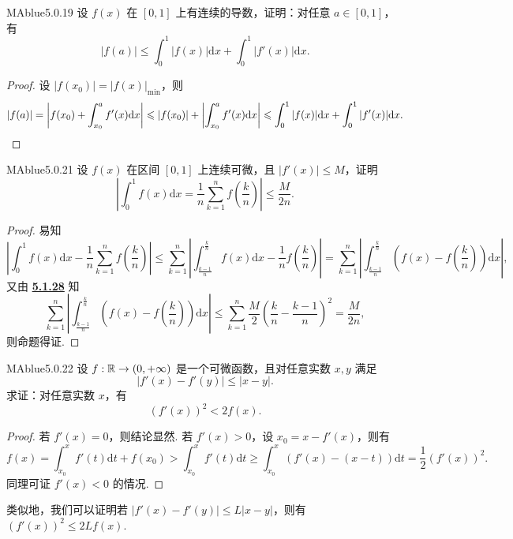 \begin{problem}{MAblue}{5.0.19}
    设 $f(x)$ 在 $[0, 1]$ 上有连续的导数，证明：对任意 $a \in [0, 1]$，有
    \[
        |f(a)| \leqslant \int_0^1 |f(x)| \mathrm dx + \int_0^1 |f'(x)| \mathrm dx.
    \]
\end{problem}

\begin{proof}
    设 $|f(x_0)| = |f(x)|_{\min}$，则
    \[
        |f(a)| = \left| f(x_0) + \int_{x_0}^a f'(x) \mathrm dx \right| \leqslant |f(x_0)| + \left| \int_{x_0}^a f'(x) \mathrm dx \right| \leqslant \int_0^1 |f(x)| \mathrm dx + \int_0^1 |f'(x)| \mathrm dx. \qedhere
    \]
\end{proof}

\begin{problem}{MAblue}{5.0.21}
    设 $f(x)$ 在区间 $[0, 1]$ 上连续可微，且 $|f'(x)| \leqslant M$，证明
    \[
        \left| \int_0^1 f(x) \mathrm dx = \frac 1 n \sum_{k=1}^n f \left( \frac k n \right) \right| \leqslant \frac M {2n}.
    \]
\end{problem}

\begin{proof}
    易知
    {\small
        \[
            \left| \int_0^1 f(x) \mathrm dx - \frac 1 n \sum_{k=1}^n f\left( \frac k n \right) \right| \leqslant \sum_{k=1}^n \left| \int_{\frac {k-1} n}^{\frac k n} f(x) \mathrm dx - \frac 1 n f\left( \frac k n \right) \right| = \sum_{k=1}^n \left| \int_{\frac {k-1} n}^{\frac k n} \left( f(x) - f\left( \frac k n \right) \right) \mathrm dx \right|,
        \]
    }
    {\flushleft 又由 \hyperref[item:28]{\textbf{5.1.28}} 知}
    \[
        \sum_{k=1}^n \left| \int_{\frac {k-1} n}^{\frac k n} \left( f(x) - f\left( \frac k n \right) \right) \mathrm dx \right| \leqslant \sum_{k=1}^n \frac M 2 (\frac k n - \frac {k-1} n)^2 = \frac M {2n},
    \]
    则命题得证.
\end{proof}

\begin{problem}{MAblue}{5.0.22}
    设 $f : \mathbb R \to (0, +\infty)$ 是一个可微函数，且对任意实数 $x, y$ 满足
    \[
        |f'(x)-f'(y)| \leqslant |x-y|.
    \]
    求证：对任意实数 $x$，有
    \[
        \left( f'(x) \right)^2 < 2f(x).
    \]
\end{problem}

\begin{proof}
    若 $f'(x) = 0$，则结论显然. 若 $f'(x) > 0$，设 $x_0 = x - f'(x)$，则有
    \[
        f(x) = \int_{x_0}^x f'(t) \mathrm dt + f(x_0) > \int_{x_0}^x f'(t) \mathrm dt \geqslant \int_{x_0}^x (f'(x) - (x-t)) \mathrm dt = \frac 1 2 (f'(x))^2.
    \]
    同理可证 $f'(x) < 0$ 的情况.
\end{proof}
{\flushleft 类似地，我们可以证明若 $|f'(x) - f'(y)| \leqslant L|x-y|$，则有 $(f'(x))^2 \leqslant 2L f(x)$.}
